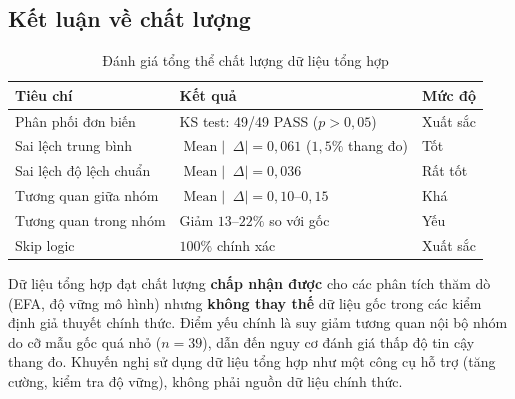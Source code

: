 \documentclass[12pt,a4paper]{article}
\newcommand{\diff}{\mathop{}\!\Delta}
\newcommand{\abs}[1]{\lvert #1 \rvert}
\begin{document}
\subsection{Kết luận về chất lượng}

\begin{table}[H]
\centering
\caption{Đánh giá tổng thể chất lượng dữ liệu tổng hợp}
\label{tab:summary}
\begin{tabular}{lp{6cm}p{4cm}}
\toprule
Tiêu chí & Kết quả & Mức độ \\
\midrule
Phân phối đơn biến & KS test: 49/49 PASS ($p > 0{,}05$) & Xuất sắc \\
Sai lệch trung bình & $\operatorname{Mean}\abs{\diff} = 0{,}061$ ($1{,}5\%$ thang đo) & Tốt \\
Sai lệch độ lệch chuẩn & $\operatorname{Mean}\abs{\diff} = 0{,}036$ & Rất tốt \\
Tương quan giữa nhóm & $\operatorname{Mean}\abs{\diff} = 0{,}10$--$0{,}15$ & Khá \\
Tương quan trong nhóm & Giảm $13$--$22\%$ so với gốc & Yếu \\
Skip logic & $100\%$ chính xác & Xuất sắc \\
\bottomrule
\end{tabular}
\end{table}

Dữ liệu tổng hợp đạt chất lượng \textbf{chấp nhận được} 
cho các phân tích thăm dò (EFA, độ vững mô hình) 
nhưng \textbf{không thay thế} dữ liệu gốc trong các kiểm định 
giả thuyết chính thức. 
Điểm yếu chính là suy giảm tương quan nội bộ nhóm 
do cỡ mẫu gốc quá nhỏ ($n = 39$), 
dẫn đến nguy cơ đánh giá thấp độ tin cậy thang đo. 
Khuyến nghị sử dụng dữ liệu tổng hợp như một công cụ hỗ trợ 
(tăng cường, kiểm tra độ vững), không phải nguồn dữ liệu chính thức.
\end{document}
